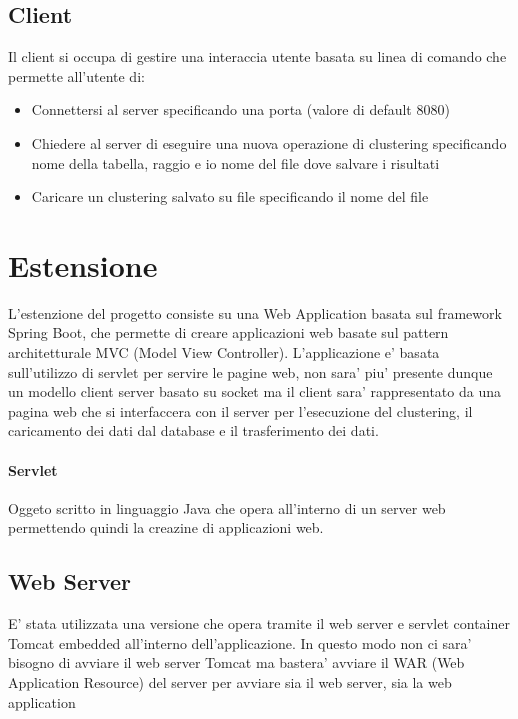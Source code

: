 \documentclass{article}
\begin{document}
        \subsection{Client}
        Il client si occupa di gestire una interaccia utente basata su linea di 
        comando che permette all'utente di:
            \begin{itemize}
                \item Connettersi al server specificando una porta (valore di 
                default 8080)
                \item Chiedere al server di eseguire una nuova operazione di
                clustering specificando nome della tabella, raggio e io nome del
                file dove salvare i risultati
                \item Caricare un clustering salvato su file specificando il
                nome del file
            \end{itemize}

    \newpage
    \section{Estensione}
    L'estenzione del progetto consiste su una Web Application basata sul
    framework Spring Boot, che permette di creare applicazioni web basate sul
    pattern architetturale MVC (Model View Controller). 
    L'applicazione e' basata sull'utilizzo di servlet per servire le pagine web,
    non sara' piu' presente dunque un modello client server basato su socket ma 
    il client sara' rappresentato da una pagina web che si interfaccera con il
    server per l'esecuzione del clustering, il caricamento dei dati dal database 
    e il trasferimento dei dati.

        \paragraph{Servlet}
        Oggeto scritto in linguaggio Java che opera all'interno di
        un server web permettendo quindi la creazine di applicazioni web.
    
        \subsection{Web Server}
        E' stata utilizzata una versione che opera tramite il web server e 
        servlet container Tomcat embedded all'interno dell'applicazione. 
        In questo modo non ci sara' bisogno di avviare il web server Tomcat ma 
        bastera' avviare il WAR (Web Application Resource) del server per 
        avviare sia il web server, sia la web application
\end{document}
